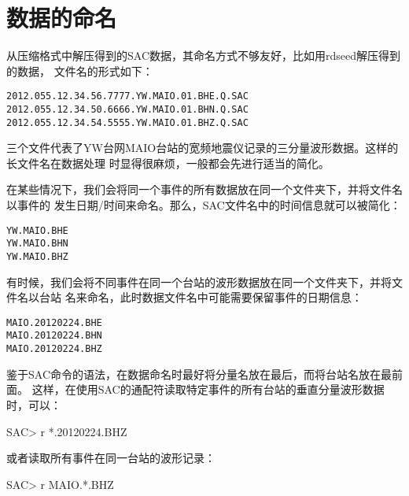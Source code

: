 \section{数据的命名}
从压缩格式中解压得到的SAC数据，其命名方式不够友好，比如用rdseed解压得到的数据，
文件名的形式如下：
\begin{lstlisting}[style=Bash]
2012.055.12.34.56.7777.YW.MAIO.01.BHE.Q.SAC
2012.055.12.34.50.6666.YW.MAIO.01.BHN.Q.SAC
2012.055.12.34.54.5555.YW.MAIO.01.BHZ.Q.SAC
\end{lstlisting}
三个文件代表了YW台网MAIO台站的宽频地震仪记录的三分量波形数据。这样的长文件名在数据处理
时显得很麻烦，一般都会先进行适当的简化。

在某些情况下，我们会将同一个事件的所有数据放在同一个文件夹下，并将文件名以事件的
发生日期/时间来命名。那么，SAC文件名中的时间信息就可以被简化：
\begin{lstlisting}[style=Bash]
YW.MAIO.BHE
YW.MAIO.BHN
YW.MAIO.BHZ
\end{lstlisting}

有时候，我们会将不同事件在同一个台站的波形数据放在同一个文件夹下，并将文件名以台站
名来命名，此时数据文件名中可能需要保留事件的日期信息：
\begin{lstlisting}[style=Bash]
MAIO.20120224.BHE
MAIO.20120224.BHN
MAIO.20120224.BHZ
\end{lstlisting}

鉴于SAC命令的语法，在数据命名时最好将分量名放在最后，而将台站名放在最前面。
这样，在使用SAC的通配符读取特定事件的所有台站的垂直分量波形数据时，可以：
\begin{SACCode}
SAC> r *.20120224.BHZ
\end{SACCode}
或者读取所有事件在同一台站的波形记录：
\begin{SACCode}
SAC> r MAIO.*.BHZ
\end{SACCode}
